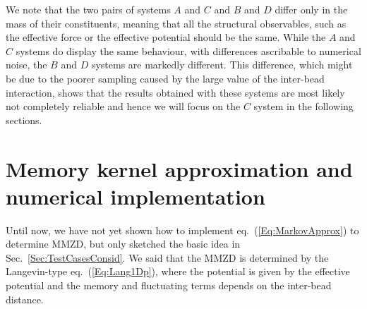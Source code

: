 \documentclass[10pt,a4paper]{book}
\theoremstyle{definition}
\begin{document}
We note that the two pairs of systems $A$ and $C$ and $B$ and $D$ differ only in the mass of their constituents, meaning that all the structural observables, such as the effective force or the effective potential should be the same. While the $A$ and $C$ systems do display the same behaviour, with differences ascribable to numerical noise, the $B$ and $D$ systems are markedly different. This difference, which might be due to the poorer sampling caused by the large value of the inter-bead interaction, shows that the results obtained with these systems are most likely not completely reliable and hence we will focus on the $C$ system in the following sections. 

\section{Memory kernel approximation and numerical implementation}
Until now, we have not yet shown how to implement eq.~(\ref{Eq:MarkovApprox}) to determine MMZD, but only sketched the basic idea in Sec.~\ref{Sec:TestCasesConsid}. We said that the MMZD is determined by the Langevin-type eq.~(\ref{Eq:Lang1Dp}), where the potential is given by the effective potential and the memory and fluctuating terms depends on the inter-bead distance. 
\end{document}
